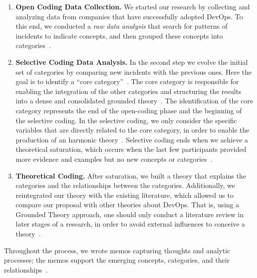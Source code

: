 \begin{enumerate}[label=(\Alph*)]
\item {\bf Open Coding Data Collection.} We started our research
  by collecting and analyzing data from companies that have successfully adopted DevOps.
  To this end, we conducted a \emph{raw data analysis} that search for patterns of
  incidents to indicate concepts,  and then grouped these concepts into
  categories~\cite{stol2016grounded}.

\item {\bf Selective Coding Data Analysis.} In the second step we evolve
  the initial set of
  categories by comparing new incidents with the previous ones. Here the goal is
  to identify a ``core category''~\cite{stol2016grounded}.
  The core category is responsible for enabling the integration of the other
  categories and structuring the results into a dense and consolidated grounded
  theory~\cite{jantunen2014using}. The identification of the core category
  represents the end of the open-coding phase and the beginning of the selective coding.
  In the selective coding, we only consider the specific variables that are directly
  related to the core category, in order to enable the production of an harmonic
  theory~\cite{coleman2007using,hoda2011impact}. Selective coding ends when we
  achieve a theoretical saturation, which occurs when the last few
  participants provided more evidence and examples but no new concepts or
  categories~\cite{glase1967discovery}.

\item {\bf Theoretical Coding.} After saturation, we built a theory that
explains the categories and the relationships between the categories.
Additionally, we reintegrated our theory with the existing literature, {\color{red}which allowed us to compare our proposal
 with other theories about DevOps}. That is, using a Grounded Theory approach,
 one should only conduct a literature review in later stages of a research,
in order to avoid external influences to conceive a theory~\cite{adolph2012reconciling}.

\end{enumerate}

Throughout the process, we wrote memos capturing thoughts and analytic
processes; the memos support the emerging concepts, categories, and their
relationships~\cite{adolph2012reconciling}.


